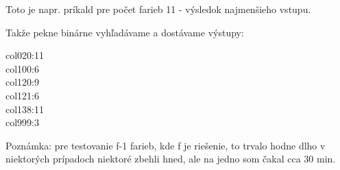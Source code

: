 \documentclass[a4paper,11pt]{article}
\begin{document}
Toto je napr. príkald pre počet farieb 11 - výsledok najmenšieho vstupu.

Takže pekne binárne vyhľadávame a dostávame výstupy:

col020:11\\
col100:6\\
col120:9\\
col121:6\\
col138:11\\
col999:3

Poznámka: pre testovanie f-1 farieb, kde f je riešenie, to trvalo hodne dlho v niektorých prípadoch niektoré zbehli hned, ale na jedno som čakal cca 30 min.
\end{document}
